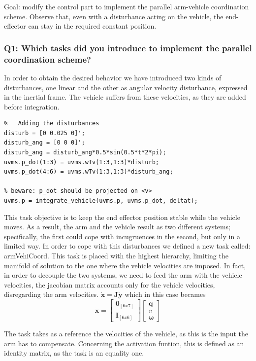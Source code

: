 \documentclass{article}
\begin{document}
Goal: modify the control part to implement the parallel arm-vehicle coordination scheme. Observe that, even with a disturbance acting on the vehicle, the end-effector can stay in the required constant position.

\subsubsection{Q1: Which tasks did you introduce to implement the parallel coordination scheme?}
In order to obtain the desired behavior we have introduced two kinds of disturbances, one linear and the other as angular velocity disturbance, expressed in the inertial frame. The vehicle suffers from these velocities, as they are added before integration. 
\begin{lstlisting}
%	Adding the disturbances
disturb = [0 0.025 0]';
disturb_ang = [0 0 0]';
disturb_ang = disturb_ang*0.5*sin(0.5*t*2*pi);
uvms.p_dot(1:3) = uvms.wTv(1:3,1:3)*disturb;
uvms.p_dot(4:6) = uvms.wTv(1:3,1:3)*disturb_ang;
    
% beware: p_dot should be projected on <v>
uvms.p = integrate_vehicle(uvms.p, uvms.p_dot, deltat);
\end{lstlisting}
This task objective is to keep the end effector position stable while the vehicle moves. As a result, the arm and the vehicle result as two different systems; specifically, the first could cope with incugruences in the second, but only in a limited way.
In order to cope with this disturbances we defined a new task called: armVehiCoord.
This task is placed with the highest hierarchy, limiting the manifold of solution to the one where the vehicle velocities are imposed. In fact, in order to decouple the two systems, we need to feed the arm with the vehicle velocities, the jacobian matrix accounts only for the vehicle velocities, disregarding the arm velocities.
$ \bm{\dot{x}} = \bm{J\dot{y}} $ which in this case becames 
$$ \bm{\dot{x}} = \begin{bmatrix} \bm{0}_{[6x7]} \\ \bm{I}_{[6x6]} \end{bmatrix} \begin{bmatrix} \bm{q}   \\ \bm{\textit{v}} \\ \bm{\omega} \end{bmatrix} $$

The task takes as a reference the velocities of the vehicle, as this is the input the arm has to compensate. Concerning the activation funtion, this is defined as an identity matrix, as the task is an equality one. 
\end{document}
